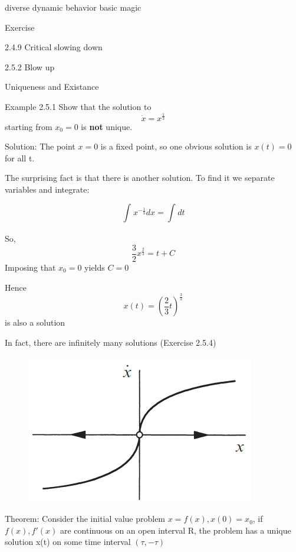 \documentclass[9pt,aspectratio=43,mathserif,table]{beamer}
\begin{document}
\begin{frame}{diverse dynamic behavior}
  basic magic

  Exercise

  2.4.9 Critical slowing down

  2.5.2 Blow up

\end{frame}

\begin{frame}{Uniqueness and Existance }  
  \begin{multicols}{2}
    Example 2.5.1 Show that the solution to  $$\dot x =  x ^ \frac{ 1}{3}$$ starting from $x_0 = 0$ is \textbf{not} unique.

    \medskip

    Solution: The point $x=0$ is a fixed point, so one obvious solution is $x (t) = 0$ for all t. 

    The surprising fact is that there is another solution. To find it we separate 
    variables and integrate:

    $$\int_{ }^{} x^{-\frac{ 1}{3}} dx = \int_{ }^{}dt $$

    So, $$\frac{ 3}{2} x ^{\frac{ 2}{3}} = t + C  $$ Imposing that $x_0 = 0$ yields $C=0$

    Hence  $$x(t) = (\frac{ 2}{3} t)^{\frac{ 3}{2}}$$ is also a solution

    In fact, there are infinitely many solutions (Exercise 2.5.4)
    \begin{figure}[!h]
      \centering
      \includegraphics[width=.3\textwidth]{fig/uniqueness.png}
    \end{figure}
  \end{multicols}
  Theorem:  Consider the initial value problem 
  $x =  f (x), x (0) = x_0$, if $f(x), f'(x)$ are continuous on an open interval R, the problem has a unique solution x(t) on some time interval $(\tau, - \tau)$
\end{frame}
\end{document}
